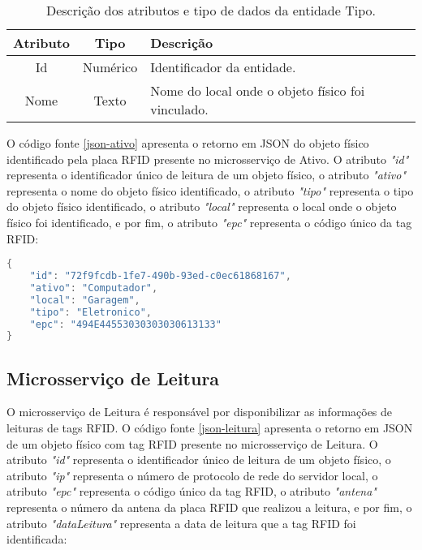 \begin{table}[htb!]
\caption{Descrição dos atributos e tipo de dados da entidade Tipo.}
\label{tab:mer-ativo-tipo}
\begin{tabular}
{| c | c | p{10.9cm} |}
\hline 
\textbf{Atributo} & \textbf{Tipo} & \textbf{Descrição} \\ \hline
Id & Numérico & Identificador da entidade. \\ \hline
Nome & Texto & Nome do local onde o objeto físico foi vinculado. \\ \hline
\end{tabular}
\end{table}

O código fonte \ref{json-ativo} apresenta o retorno em \acrshort{JSON} do objeto físico identificado pela placa \acrshort{RFID} presente no microsserviço de Ativo. O atributo \textit{"id"} representa o identificador único de leitura de um objeto físico, o atributo \textit{"ativo"} representa o nome do objeto físico identificado, o atributo \textit{"tipo"} representa o tipo do objeto físico identificado, o atributo \textit{"local"} representa o local onde o objeto físico foi identificado, e por fim, o atributo \textit{"epc"} representa o código único da tag \acrshort{RFID}:

\begin{lstlisting}[language=Java, caption={JSON de resposta do microsserviço de Ativo.}, label=json-ativo]
{
    "id": "72f9fcdb-1fe7-490b-93ed-c0ec61868167",
    "ativo": "Computador",
    "local": "Garagem",
    "tipo": "Eletronico",
    "epc": "494E44553030303030613133"
}
\end{lstlisting}

\subsection{Microsserviço de Leitura}

O microsserviço de Leitura é responsável por disponibilizar as informações de leituras de tags \acrshort{RFID}. O código fonte \ref{json-leitura} apresenta o retorno em \acrshort{JSON} de um objeto físico com tag \acrshort{RFID} presente no microsserviço de Leitura. O atributo \textit{"id"} representa o identificador único de leitura de um objeto físico, o atributo \textit{"ip"} representa o número de protocolo de rede do servidor local, o atributo \textit{"epc"} representa o código único da tag \acrshort{RFID}, o atributo \textit{"antena"} representa o número da antena da placa \acrshort{RFID} que realizou a leitura, e por fim, o atributo \textit{"dataLeitura"} representa a data de leitura que a tag \acrshort{RFID} foi identificada:

